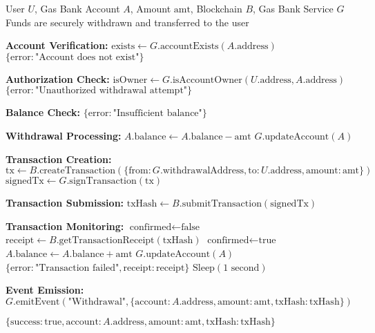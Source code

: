 \begin{protocol}
\label{prot:gas-bank-withdrawal}
\begin{algorithmic}[1]
\Require User $U$, Gas Bank Account $A$, Amount $\text{amt}$, Blockchain $B$, Gas Bank Service $G$
\Ensure Funds are securely withdrawn and transferred to the user

\State \textbf{Account Verification:}
\State $\text{exists} \gets G.\text{accountExists}(A.\text{address})$
    \State \Return $\{\text{error}: \text{"Account does not exist"}\}$
\EndIf

\State \textbf{Authorization Check:}
\State $\text{isOwner} \gets G.\text{isAccountOwner}(U.\text{address}, A.\text{address})$
    \State \Return $\{\text{error}: \text{"Unauthorized withdrawal attempt"}\}$
\EndIf

\State \textbf{Balance Check:}
    \State \Return $\{\text{error}: \text{"Insufficient balance"}\}$
\EndIf

\State \textbf{Withdrawal Processing:}
\State $A.\text{balance} \gets A.\text{balance} - \text{amt}$
\State $G.\text{updateAccount}(A)$

\State \textbf{Transaction Creation:}
\State $\text{tx} \gets B.\text{createTransaction}(\{\text{from}: G.\text{withdrawalAddress}, \text{to}: U.\text{address}, \text{amount}: \text{amt}\})$
\State $\text{signedTx} \gets G.\text{signTransaction}(\text{tx})$

\State \textbf{Transaction Submission:}
\State $\text{txHash} \gets B.\text{submitTransaction}(\text{signedTx})$

\State \textbf{Transaction Monitoring:}
\State $\text{confirmed} \gets \text{false}$
    \State $\text{receipt} \gets B.\text{getTransactionReceipt}(\text{txHash})$
            \State $\text{confirmed} \gets \text{true}$
            \State $A.\text{balance} \gets A.\text{balance} + \text{amt}$ 
            \State $G.\text{updateAccount}(A)$
            \State \Return $\{\text{error}: \text{"Transaction failed"}, \text{receipt}: \text{receipt}\}$
        \EndIf
    \EndIf
        \State $\text{Sleep}(1\text{ second})$
    \EndIf
\EndWhile

\State \textbf{Event Emission:}
\State $G.\text{emitEvent}(\text{"Withdrawal"}, \{\text{account}: A.\text{address}, \text{amount}: \text{amt}, \text{txHash}: \text{txHash}\})$

\State \Return $\{\text{success}: \text{true}, \text{account}: A.\text{address}, \text{amount}: \text{amt}, \text{txHash}: \text{txHash}\}$
\end{algorithmic}
\end{protocol}

